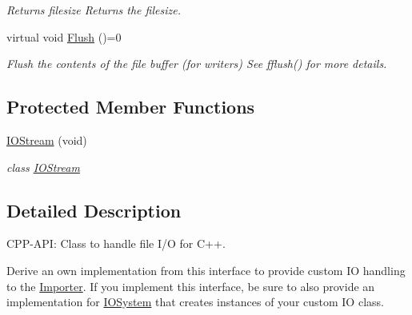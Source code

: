 \begin{DoxyCompactItemize}
\begin{DoxyCompactList}\small\item\em Returns filesize Returns the filesize. \end{DoxyCompactList}\item 
\hypertarget{class_assimp_1_1_i_o_stream_a7c19952446ece90924b246f087417899}{virtual void \hyperlink{class_assimp_1_1_i_o_stream_a7c19952446ece90924b246f087417899}{Flush} ()=0}\label{class_assimp_1_1_i_o_stream_a7c19952446ece90924b246f087417899}

\begin{DoxyCompactList}\small\item\em Flush the contents of the file buffer (for writers) See fflush() for more details. \end{DoxyCompactList}\end{DoxyCompactItemize}
\subsection*{Protected Member Functions}
\begin{DoxyCompactItemize}
\item 
\hyperlink{class_assimp_1_1_i_o_stream_af5ae78123b6c6f7afc31b2a52dc9192e}{I\+O\+Stream} (void)
\begin{DoxyCompactList}\small\item\em class \hyperlink{class_assimp_1_1_i_o_stream}{I\+O\+Stream} \end{DoxyCompactList}\end{DoxyCompactItemize}


\subsection{Detailed Description}
C\+P\+P-\/\+A\+P\+I\+: Class to handle file I/\+O for C++. 

Derive an own implementation from this interface to provide custom I\+O handling to the \hyperlink{class_assimp_1_1_importer}{Importer}. If you implement this interface, be sure to also provide an implementation for \hyperlink{class_assimp_1_1_i_o_system}{I\+O\+System} that creates instances of your custom I\+O class. 

